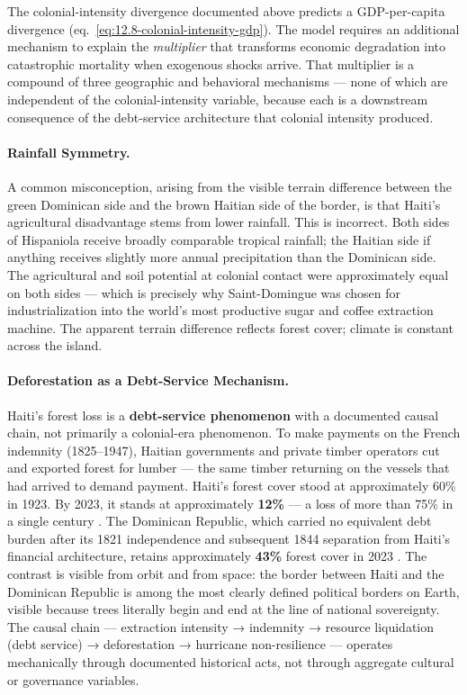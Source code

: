 The colonial-intensity divergence documented above predicts a GDP-per-capita divergence (eq.~\ref{eq:12.8-colonial-intensity-gdp}). The model requires an additional mechanism to explain the \textit{multiplier} that transforms economic degradation into catastrophic mortality when exogenous shocks arrive. That multiplier is a compound of three geographic and behavioral mechanisms --- none of which are independent of the colonial-intensity variable, because each is a downstream consequence of the debt-service architecture that colonial intensity produced.

\paragraph{Rainfall Symmetry.}
A common misconception, arising from the visible terrain difference between the green Dominican side and the brown Haitian side of the border, is that Haiti's agricultural disadvantage stems from lower rainfall. This is incorrect. Both sides of Hispaniola receive broadly comparable tropical rainfall; the Haitian side if anything receives slightly more annual precipitation than the Dominican side. The agricultural and soil potential at colonial contact were approximately equal on both sides --- which is precisely why Saint-Domingue was chosen for industrialization into the world's most productive sugar and coffee extraction machine. The apparent terrain difference reflects forest cover; climate is constant across the island.

\paragraph{Deforestation as a Debt-Service Mechanism.}
Haiti's forest loss is a \textbf{debt-service phenomenon} with a documented causal chain, not primarily a colonial-era phenomenon. To make payments on the French indemnity (1825--1947), Haitian governments and private timber operators cut and exported forest for lumber --- the same timber returning on the vessels that had arrived to demand payment. Haiti's forest cover stood at approximately 60\% in 1923. By 2023, it stands at approximately \textbf{12\%} --- a loss of more than 75\% in a single century \cite{fao_fra_2020}. The Dominican Republic, which carried no equivalent debt burden after its 1821 independence and subsequent 1844 separation from Haiti's financial architecture, retains approximately \textbf{43\%} forest cover in 2023 \cite{fao_fra_2020}. The contrast is visible from orbit and from space: the border between Haiti and the Dominican Republic is among the most clearly defined political borders on Earth, visible because trees literally begin and end at the line of national sovereignty. The causal chain --- extraction intensity → indemnity → resource liquidation (debt service) → deforestation → hurricane non-resilience --- operates mechanically through documented historical acts, not through aggregate cultural or governance variables.


